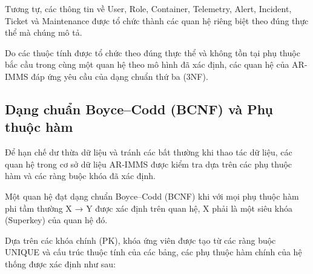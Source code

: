 Tương tự, các thông tin về User, Role, Container, Telemetry, Alert, Incident, Ticket và Maintenance được tổ chức thành các quan hệ riêng biệt theo đúng thực thể mà chúng mô tả.

Do các thuộc tính được tổ chức theo đúng thực thể và không tồn tại phụ thuộc bắc cầu trong cùng một quan hệ theo mô hình đã xác định, các quan hệ của AR-IMMS đáp ứng yêu cầu của dạng chuẩn thứ ba (3NF).

\subsection{Dạng chuẩn Boyce--Codd (BCNF) và Phụ thuộc hàm}
Để hạn chế dư thừa dữ liệu và tránh các bất thường khi thao tác dữ liệu, các quan hệ trong cơ sở dữ liệu AR-IMMS được kiểm tra dựa trên các phụ thuộc hàm và các ràng buộc khóa đã xác định.

Một quan hệ đạt dạng chuẩn Boyce–Codd (BCNF) khi với mọi phụ thuộc hàm phi tầm thường X → Y được xác định trên quan hệ, X phải là một siêu khóa (Superkey) của quan hệ đó.

Dựa trên các khóa chính (PK), khóa ứng viên được tạo từ các ràng buộc UNIQUE và cấu trúc thuộc tính của các bảng, các phụ thuộc hàm chính của hệ thống được xác định như sau:

